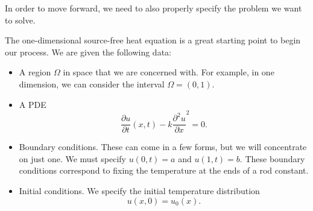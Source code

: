        In order to move forward, we need to also properly specify the problem we want to solve.
        
        The one-dimensional source-free heat equation is a great starting point to begin our process.  We are given the following data:
        \begin{itemize}
            \item A region $\Omega$ in space that we are concerned with.  For example, in one dimension, we can consider the interval $\Omega=(0,1)$.
            \item A PDE
            \[
            \frac{\partial u}{\partial t}(x,t) -k \frac{\partial^2 u}{\partial x}^2 = 0.
            \]
            \item Boundary conditions. These can come in a few forms, but we will concentrate on just one. We must specify $u(0,t)=a$ and $u(1,t)=b$.  These boundary conditions correspond to fixing the temperature at the ends of a rod constant.
            \item Initial conditions. We specify the initial temperature distribution
            \[
            u(x,0)=u_0(x).
            \]
        \end{itemize}

